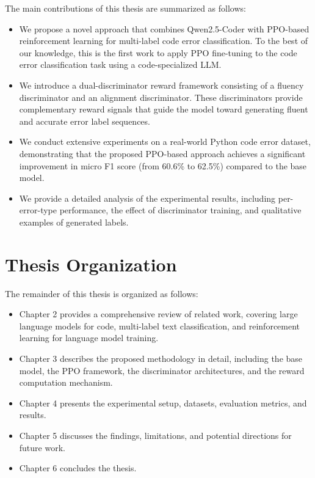 The main contributions of this thesis are summarized as follows:

\begin{itemize}
    \item We propose a novel approach that combines Qwen2.5-Coder with PPO-based reinforcement learning for multi-label code error classification. To the best of our knowledge, this is the first work to apply PPO fine-tuning to the code error classification task using a code-specialized LLM.
    \item We introduce a dual-discriminator reward framework consisting of a fluency discriminator and an alignment discriminator. These discriminators provide complementary reward signals that guide the model toward generating fluent and accurate error label sequences.
    \item We conduct extensive experiments on a real-world Python code error dataset, demonstrating that the proposed PPO-based approach achieves a significant improvement in micro F1 score (from 60.6\% to 62.5\%) compared to the base model.
    \item We provide a detailed analysis of the experimental results, including per-error-type performance, the effect of discriminator training, and qualitative examples of generated labels.
\end{itemize}

\section{Thesis Organization}

The remainder of this thesis is organized as follows:

\begin{itemize}
    \item Chapter 2 provides a comprehensive review of related work, covering large language models for code, multi-label text classification, and reinforcement learning for language model training.
    \item Chapter 3 describes the proposed methodology in detail, including the base model, the PPO framework, the discriminator architectures, and the reward computation mechanism.
    \item Chapter 4 presents the experimental setup, datasets, evaluation metrics, and results.
    \item Chapter 5 discusses the findings, limitations, and potential directions for future work.
    \item Chapter 6 concludes the thesis.
\end{itemize}

\endgroup
\endinput
